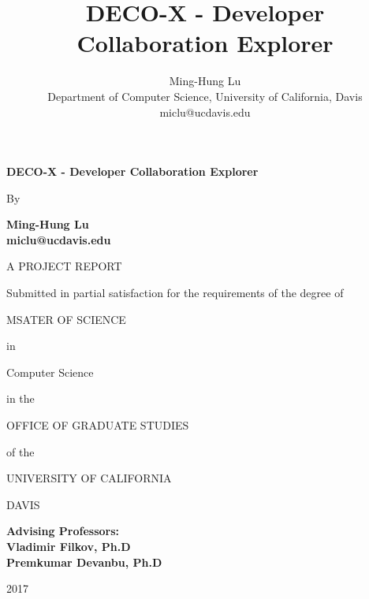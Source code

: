\documentclass{article}
\title{DECO-X - Developer Collaboration Explorer}
\author{Ming-Hung Lu \\ Department of Computer Science, University of California, Davis \\ miclu@ucdavis.edu}
\date{}
\begin{document}
\begin{titlepage}
    \begin{center}
        \vspace*{1cm}
        \textbf{DECO-X - Developer Collaboration Explorer}
    
        \vspace{0.5cm}
        
        By
        
        \vspace{0.5cm}

        \textbf{Ming-Hung Lu \\ miclu@ucdavis.edu}
        
        \vspace{0.5cm}
        
        A PROJECT REPORT
        
        \vspace{0.5cm}
        
        Submitted in partial satisfaction for the requirements of the degree of
        
        \vspace{0.5cm}
        
        
        MSATER OF SCIENCE
        
        \vspace{0.5cm}
        in
        \vspace{0.5cm}
        
        Computer Science

        \vspace{0.5cm}
        
        in the
        
        \vspace{0.5cm}
        
        OFFICE OF GRADUATE STUDIES
        
        \vspace{0.5cm}
        
        of the
        
        \vspace{0.5cm}
        
        UNIVERSITY OF CALIFORNIA
        
        \vspace{0.5cm}
        
        DAVIS
        
        \vspace{0.5cm}
        
        \textbf{Advising Professors: \\ Vladimir Filkov, Ph.D \\ Premkumar Devanbu, Ph.D }
        
        \vfill
        
        \vspace{0.8cm}
        
        2017
        
    \end{center}
\end{titlepage}
\end{document}
